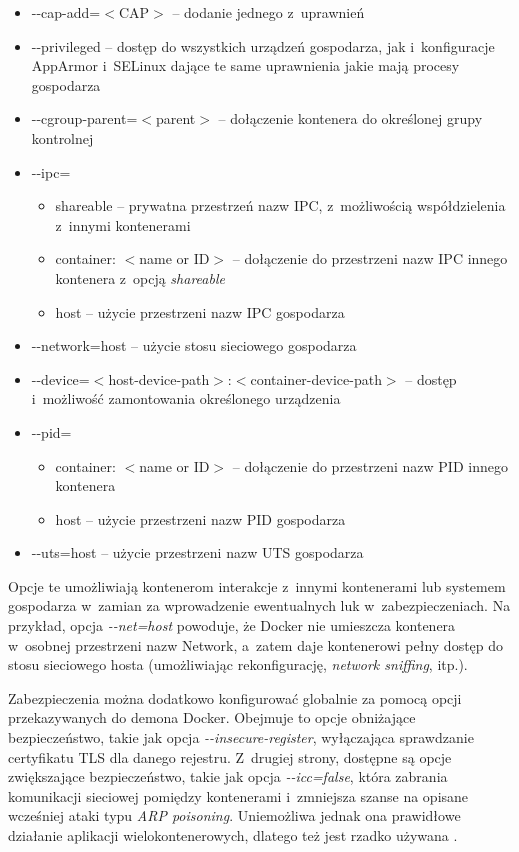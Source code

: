 \begin{itemize}
    \item -{}-cap-add=$<$CAP$>$ -- dodanie jednego z~uprawnień
    \item -{}-privileged -- dostęp do wszystkich urządzeń gospodarza, jak i~konfiguracje AppArmor i~SELinux dające te same uprawnienia jakie mają procesy gospodarza
    \item -{}-cgroup-parent=$<$parent$>$ -- dołączenie kontenera do określonej grupy kontrolnej
    \item -{}-ipc=
    \begin{itemize}
        \item shareable -- prywatna przestrzeń nazw IPC, z~możliwością współdzielenia z~innymi kontenerami
        \item container: $<$name or ID$>$ -- dołączenie do przestrzeni nazw IPC innego kontenera z~opcją \textit{shareable}
        \item host -- użycie przestrzeni nazw IPC gospodarza
    \end{itemize}
    \item -{}-network=host -- użycie stosu sieciowego gospodarza
    \item -{}-device=$<$host-device-path$>$:$<$container-device-path$>$ -- dostęp i~możliwość zamontowania określonego urządzenia
    \item -{}-pid=
    \begin{itemize}
        \item container: $<$name or ID$>$ -- dołączenie do przestrzeni nazw PID innego kontenera
        \item host -- użycie przestrzeni nazw PID gospodarza
    \end{itemize}
    \item -{}-uts=host -- użycie przestrzeni nazw UTS gospodarza
\end{itemize}

Opcje te umożliwiają kontenerom interakcje z~innymi kontenerami lub systemem gospodarza w~zamian za wprowadzenie ewentualnych luk w~zabezpieczeniach. Na przykład, opcja \textit{-{}-net=host} powoduje, że Docker nie umieszcza kontenera w~osobnej przestrzeni nazw Network, a~zatem daje kontenerowi pełny dostęp do stosu sieciowego hosta (umożliwiając rekonfigurację, \textit{network sniffing}, itp.).

Zabezpieczenia można dodatkowo konfigurować globalnie za pomocą opcji przekazywanych do demona Docker. Obejmuje to opcje obniżające bezpieczeństwo, takie jak opcja \textit{-{}-insecure-register}, wyłączająca sprawdzanie certyfikatu TLS dla danego rejestru. Z~drugiej strony, dostępne są opcje zwiększające bezpieczeństwo, takie jak opcja \textit{-{}-icc=false}, która zabrania komunikacji sieciowej pomiędzy kontenerami i~zmniejsza szanse na opisane wcześniej ataki typu \textit{ARP poisoning}. Uniemożliwa jednak ona prawidłowe działanie aplikacji wielokontenerowych, dlatego też jest rzadko używana \cite{DockerRunReference}.

